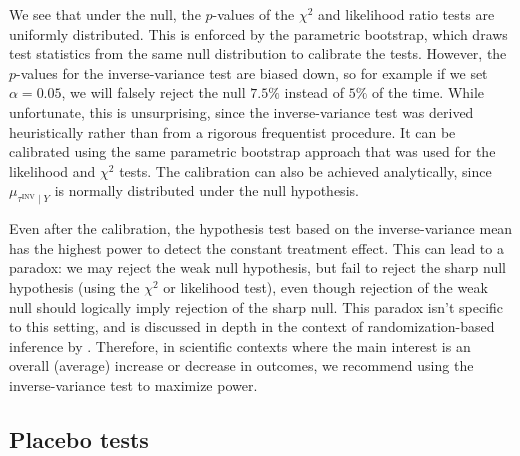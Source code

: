 \documentclass[letter]{article}
\newcommand{\invvar}{\tau^{\mathrm{INV}}}
\renewcommand{\cite}[1]{\citep{#1}}
\begin{document}
We see that under the null, the \(p\)-values of the \(\chi^2\) and likelihood ratio tests are uniformly distributed. This is enforced by the parametric bootstrap, which draws test statistics from the same null distribution to calibrate the tests. However, the \(p\)-values for the inverse-variance test are biased down, so for example if we set \(\alpha=0.05\), we will falsely reject the null \(7.5\%\) instead of \(5\%\) of the time. While unfortunate, this is unsurprising, since the inverse-variance test was derived heuristically rather than from a rigorous frequentist procedure. It can be calibrated using the same parametric bootstrap approach that was used for the likelihood and \(\chi^2\) tests. The calibration can also be achieved analytically, since \(\mu_{\invvar \mid Y}\) is normally distributed under the null hypothesis.

Even after the calibration, the hypothesis test based on the inverse-variance mean has the highest power to detect the constant treatment effect. This can lead to a paradox: we may reject the weak null hypothesis, but fail to reject the sharp null hypothesis (using the \(\chi^2\) or likelihood test), even though rejection of the weak null should logically imply rejection of the sharp null. This paradox isn't specific to this setting, and is discussed in depth in the context of randomization-based inference by \cite{Ding:2014sf}. Therefore, in scientific contexts where the main interest is an overall (average) increase or decrease in outcomes, we recommend using the inverse-variance test to maximize power.
    


    	\subsection{Placebo tests}\label{placebo-tests}
    
\end{document}
